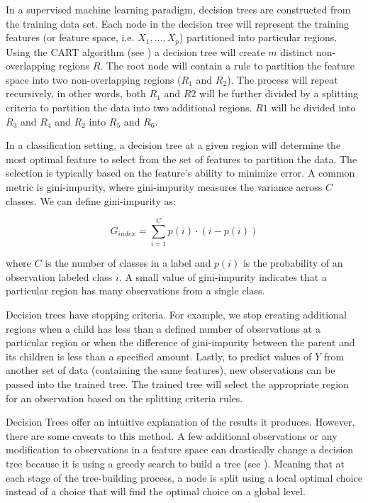 In a supervised machine learning paradigm, decision trees are constructed from the training data set.  Each node in the decision tree will represent the training features (or feature space, i.e. \(X_1,...,X_p\)) partitioned into particular regions. Using the CART algorithm (see \cite{CART}) a decision tree will create \(m\) distinct non-overlapping regions \(R\). The root node will contain a rule to partition the feature space into two non-overlapping regions (\(R_1\) and \(R_2\)). The process will repeat recursively, in other words, both \(R_1\) and \(R2\) will be further divided by a splitting criteria to partition the data into two additional regions. \(R1\) will be divided into \(R_3\) and \(R_4\)  and \(R_2\) into  \(R_5\) and \(R_6\). 


In a classification setting, a decision tree at a given region will determine the most optimal feature to select from the set of features to partition the data.  The selection is typically based on the feature's ability to minimize error.  A common metric is gini-impurity, where gini-impurity measures the variance across \(C\) classes. We can define gini-impurity as: 

\begin{equation}
\label{eq:GiniImpurity}
G_{index} = \sum_{i=1}^{C} p(i) \cdot (i - p(i))
\end{equation}

\noindent where \(C\) is the number of classes in a label and \(p(i)\) is the probability of an observation labeled class \(i\).  A small value of gini-impurity indicates that a particular region has many observations from a single class. 

Decision trees have stopping criteria.  For example, we stop creating additional regions when a child has less than a defined number of observations at a particular region or when the difference of gini-impurity between the parent and its children is less than a specified amount.  Lastly, to predict values of \(Y\) from another set of data (containing the same features), new observations can be passed into the trained tree.  The trained tree will select the appropriate region for an observation based on the splitting criteria rules. 

Decision Trees offer an intuitive explanation of the results it produces. However, there are some caveats to this method.  A few additional observations or any modification to observations in a feature space can drastically change a decision tree because it is using a greedy search to build a tree (see \cite{koning2017decision}). Meaning that at each stage of the tree-building process, a node is split using a local optimal choice instead of a choice that will find the optimal choice on a global level. 

